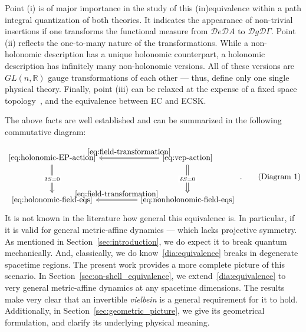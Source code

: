 \documentclass[../../main.tex]{subfiles}
\begin{document}
Point (i) is of major importance in the study of this (in)equivalence within a path integral quantization of both theories. It indicates the appearance of non-trivial insertions if one transforms the functional measure from $\mathcal{D}e\mathcal{D}A$ to $\mathcal{D}g\mathcal{D}\Gamma$. Point (ii) reflects the one-to-many nature of the  transformations. While a non-holonomic description has a unique holonomic counterpart, a holonomic description has infinitely many non-holonomic versions. All of these versions are $GL\left(n,\mathbb{R}\right)$ gauge transformations of each other --- thus, define only one single physical theory. Finally, point (iii) can be relaxed at the expense of a fixed space topology~\cite{geroch1967,tipler1977,horowitz1991,borde1994,borde1999,heveling2022}, and the equivalence between EC and ECSK.

The above facts are well established and can be summarized in the following commutative diagram:

\begin{equation}\label{dia:equivalence}
  \begin{tikzcd}[row sep=huge, column sep=huge]
    \text{\eqref{eq:holonomic-EP-action}} \arrow[d, Rightarrow, "\delta S = 0" description]
    \arrow[r, Leftarrow, "\eqref{eq:field-transformation}"]
    &
    \text{\eqref{eq:vep-action}} \arrow[d, Rightarrow, "\delta S =0" description]
    \\
    \text{\eqref{eq:holonomic-field-eqs}}
    \arrow[r, Leftarrow, "\eqref{eq:field-transformation}"]
    &
    \text{\eqref{eq:nonholonomic-field-eqs}}
  \end{tikzcd} \;. \tag{Diagram 1}
\end{equation}
It is not known in the literature how general this equivalence is. In particular, if it is valid for general metric-affine dynamics --- which lacks projective symmetry. As mentioned in Section~\ref{sec:introduction}, we do expect it to break quantum mechanically. And, classically, we do know~\ref{dia:equivalence} breaks in degenerate spacetime regions. The present work provides a more complete picture of this scenario. In Section~\ref{sec:on-shell_equivalence}, we extend~\ref{dia:equivalence} to very general metric-affine dynamics at any spacetime dimensions. The results make very clear that an invertible \textit{vielbein} is a general requirement for it to hold. Additionally, in Section~\ref{sec:geometric_picture}, we give its geometrical formulation, and clarify its underlying physical meaning.
\end{document}
